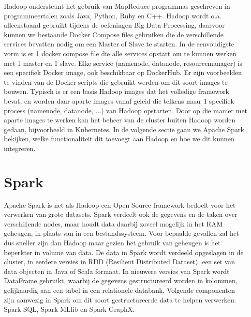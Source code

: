 Hadoop ondersteunt het gebruik van MapReduce programmas geschreven in programmeertalen zoals Java, Python, Ruby en C++.
\textcite{Taylor2023}
\newline
\newline
Hadoop wordt o.a. alleenstaand gebruikt tijdens de oefeningen Big Data Processing, daarvoor kunnen we bestaande Docker Compose files gebruiken die de verschillende services bevatten nodig om een Master of Slave te starten.
In de eenvoudigste vorm is er 1 docker compose file die alle services opstart om te kunnen werken met 1 master en 1 slave.
\newline
\newline
Elke service (namenode, datanode, resourcemanager) is een specifiek Docker image, ook beschikbaar op DockerHub. Er zijn voorbeelden te vinden van de Docker scripts die gebruikt werden om dit soort images te bouwen. Typisch is er een basis Hadoop images dat het volledige framework bevat, en worden daar aparte images vanaf geleid die telkens maar 1 specifiek process (namenode, datanode, ...) van Hadoop opstarten.
Door op die manier met aparte images te werken kan het beheer van de cluster buiten Hadoop worden gedaan, bijvoorbeeld in Kubernetes.
\newline
\newline
In de volgende sectie gaan we Apache Spark bekijken, welke functionaliteit dit toevoegt aan Hadoop en hoe we dit kunnen integreren.
\newline
\newline

\section{Spark}
Apache Spark is net als Hadoop een Open Source framework bedoelt voor het verwerken van grote datasets. Spark verdeelt ook de gegevens en de taken over verschillende nodes, maar houdt data daarbij zoveel mogelijk in het RAM geheugen, in plaats van in een bestandssysteem. Voor bepaalde gevallen zal het dus sneller zijn dan Hadoop maar gezien het gebruik van geheugen is het beperkter in volume van data.
\newline
\textcite{AwsAmazon2023a}
\newline
De data in Spark wordt verdeeld opgeslagen in de cluster, in eerdere versies in RDD (Resilient Distributed Dataset), een set van data objecten in Java of Scala formaat. In nieuwere versies van Spark wordt DataFrame gebruikt, waarbij de gegevens gestructureerd worden in kolommen, gelijkaardig aan een tabel in een relationele databank. Volgende componenten zijn aanwezig in Spark om dit soort gestructureerde data te helpen verwerken: Spark SQL, Spark MLlib en Spark GraphX.
\newline
\newline



